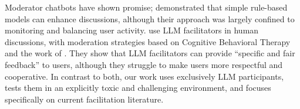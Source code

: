 Moderator chatbots have shown promise; \citet{kim_et_al_chatbot} demonstrated that simple rule-based models can enhance discussions, although their approach was largely confined to monitoring and balancing user activity. \citet{cho-etal-2024-language} use \ac{LLM} facilitators in human discussions, with moderation strategies based on Cognitive Behavioral Therapy and the work of \citet{rosenberg2015nonviolent}. They show that \ac{LLM} facilitators can provide “specific and fair feedback” to users, although they struggle to make users more respectful and cooperative.  In contrast to both, our work uses exclusively \ac{LLM} participants, tests them in an explicitly toxic and challenging environment, and focuses specifically on current facilitation literature.
